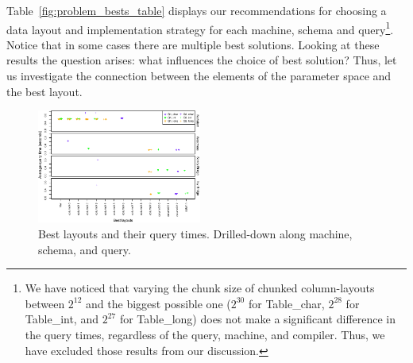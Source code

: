 \documentclass{sig-alternate}
\begin{document}
Table~\ref{fig:problem_bests_table} displays our recommendations for choosing a data layout and implementation strategy for each machine, schema and query\footnote{We have noticed that varying the chunk size of chunked column-layouts between $2^{12}$ and the biggest possible one ($2^{30}$ for Table\_char, $2^{28}$ for Table\_int, and $2^{27}$ for Table\_long) does not make a significant difference in the query times, regardless of the query, machine, and compiler. Thus, we have excluded those results from our discussion.
}. Notice that in some cases there are multiple best solutions. Looking at these results the question arises: what influences the choice of best solution? Thus, let us investigate the connection between the elements of the parameter space and the best layout. %

\begin{figure}[!h]
\vspace{-5pt}
\centering
\includegraphics[width=0.48\textwidth]{pdf/problem_bests_plot.pdf}
\vspace{-20pt}
\caption{Best layouts and their query times. Drilled-down along machine, schema, and query.}  
\label{fig:problem_bests_plot}
\vspace{-10pt}
\end{figure}
\end{document}
